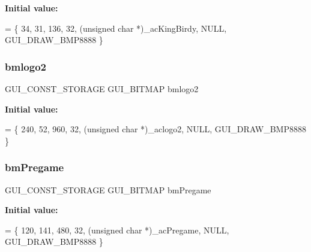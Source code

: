 {\bfseries Initial value\+:}
\begin{DoxyCode}
= \{
  34, 
  31, 
  136, 
  32, 
  (\textcolor{keywordtype}{unsigned} \textcolor{keywordtype}{char} *)\_acKingBirdy,  
  NULL,  
  GUI\_DRAW\_BMP8888
\}
\end{DoxyCode}
\mbox{\label{group___flappy___bird_gacc645a283949b10be3aa313b20b95f95}} 
\subsubsection{\texorpdfstring{bmlogo2}{bmlogo2}}
{\footnotesize\ttfamily G\+U\+I\+\_\+\+C\+O\+N\+S\+T\+\_\+\+S\+T\+O\+R\+A\+GE G\+U\+I\+\_\+\+B\+I\+T\+M\+AP bmlogo2}

{\bfseries Initial value\+:}
\begin{DoxyCode}
= \{
  240, 
  52, 
  960, 
  32, 
  (\textcolor{keywordtype}{unsigned} \textcolor{keywordtype}{char} *)\_aclogo2,  
  NULL,  
  GUI\_DRAW\_BMP8888
\}
\end{DoxyCode}
\mbox{\label{group___flappy___bird_gad17411bd07bfb3ac5aad8ec61f1d8ca4}} 
\subsubsection{\texorpdfstring{bm\+Pregame}{bmPregame}}
{\footnotesize\ttfamily G\+U\+I\+\_\+\+C\+O\+N\+S\+T\+\_\+\+S\+T\+O\+R\+A\+GE G\+U\+I\+\_\+\+B\+I\+T\+M\+AP bm\+Pregame}

{\bfseries Initial value\+:}
\begin{DoxyCode}
= \{
  120, 
  141, 
  480, 
  32, 
  (\textcolor{keywordtype}{unsigned} \textcolor{keywordtype}{char} *)\_acPregame,  
  NULL,  
  GUI\_DRAW\_BMP8888
\}
\end{DoxyCode}
